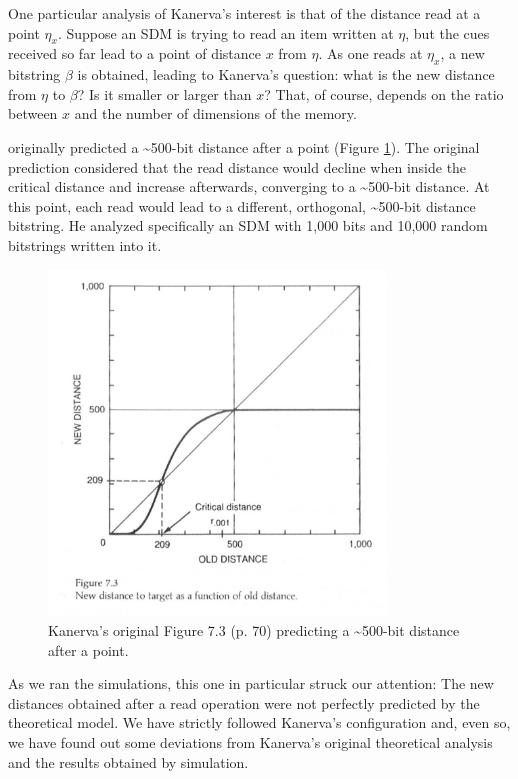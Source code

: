 
One particular analysis of Kanerva's interest is that of the distance read at a point $\eta_x$. Suppose an SDM is trying to read an item written at $\eta$, but the cues received so far lead to a point of distance $x$ from $\eta$.  As one reads at $\eta_x$, a new bitstring $\beta$ is obtained, leading to Kanerva's question: what is the new distance from $\eta$ to $\beta$? Is it smaller or larger than $x$? That, of course, depends on the ratio between $x$ and the number of dimensions of the memory.

\citet[p.70]{Kanerva1988} originally predicted a \textasciitilde 500-bit distance after a point (Figure \ref{fig:kanerva-figure-7.3}). The original prediction considered that the read distance would decline when inside the critical distance and increase afterwards, converging to a \textasciitilde 500-bit distance.  At this point, each read would lead to a different, orthogonal, \textasciitilde 500-bit distance bitstring. He analyzed specifically an SDM with 1,000 bits and 10,000 random bitstrings written into it.

\begin{figure}[h]
\centering\includegraphics[width=0.8\textwidth]{images02/kanerva-table-7-2-original.png}
\caption{Kanerva's original Figure 7.3 (p. 70) predicting a \textasciitilde 500-bit distance after a point.
\label{fig:kanerva-figure-7.3}}
\end{figure}

As we ran the simulations, this one in particular struck our attention: The new distances obtained after a read operation were not perfectly predicted by the theoretical model. We have strictly followed Kanerva's configuration and, even so, we have found out some deviations from Kanerva's original theoretical analysis and the results obtained by simulation.

